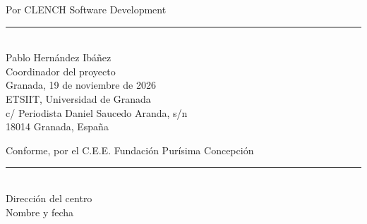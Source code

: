 \documentclass[a4paper,10pt]{article}
\begin{document}
\noindent
\begin{minipage}[t]{0.47\textwidth}
{\footnotesize\color{gris} Por CLENCH Software Development}\\[1.8cm]
{\color{linea}\rule{\textwidth}{0.4pt}}\\[2pt]
{\small Pablo Hernández Ibáñez}\\
{\footnotesize\color{gris} Coordinador del proyecto\\ Granada, 19 de noviembre de 2026\\
ETSIIT, Universidad de Granada\\
c/ Periodista Daniel Saucedo Aranda, s/n\\
18014 Granada, España}
\end{minipage}%
\hfill
\begin{minipage}[t]{0.47\textwidth}
{\footnotesize\color{gris} Conforme, por el C.E.E. Fundación Purísima Concepción}\\[1.8cm]
{\color{linea}\rule{\textwidth}{0.4pt}}\\[2pt]
{\small Dirección del centro}\\
{\footnotesize\color{gris} Nombre y fecha}
\end{minipage}
\end{document}
